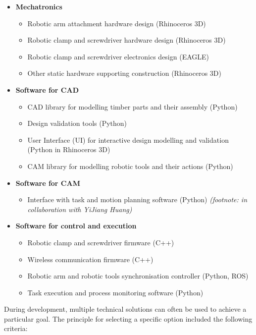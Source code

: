\documentclass[11pt]{book}
\begin{document}
\begin{itemize}
	\item \textbf{Mechatronics}

\begin{itemize}
	\item Robotic arm attachment hardware design (Rhinoceros 3D) 

	\item Robotic clamp and screwdriver hardware design (Rhinoceros 3D) 

	\item Robotic clamp and screwdriver electronics design (EAGLE)

	\item Other static hardware supporting construction (Rhinoceros 3D) 

\end{itemize}
	\item \textbf{Software for CAD}

\begin{itemize}
	\item CAD library for modelling timber parts and their assembly (Python)

	\item Design validation tools (Python)

	\item User Interface (UI) for interactive design modelling and validation (Python in Rhinoceros 3D) 

	\item CAM library for modelling robotic tools and their actions (Python)

\end{itemize}
	\item \textbf{Software for CAM}

\begin{itemize}
	\item Interface with task and motion planning software (Python) \textit{(footnote: in collaboration with YiJiang Huang)}

\end{itemize}
	\item \textbf{Software for control and execution}

\begin{itemize}
	\item Robotic clamp and screwdriver firmware (C++)

	\item Wireless communication firmware (C++)

	\item Robotic arm and robotic tools synchronisation controller (Python, ROS)

	\item Task execution and process monitoring software (Python)

\end{itemize}
\end{itemize}
During development, multiple technical solutions can often be used to achieve a particular goal. The principle for selecting a specific option included the following criteria: 
\end{document}

